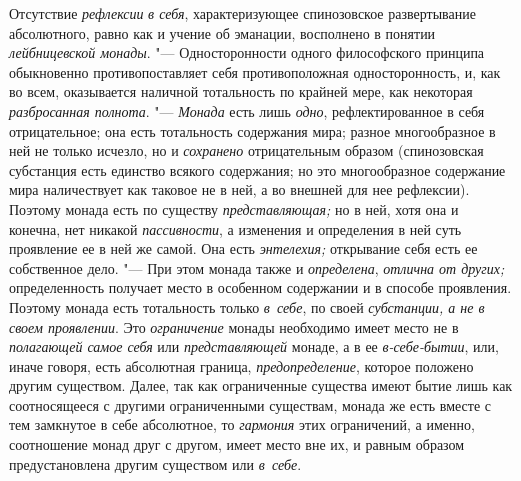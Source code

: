 Отсутствие {\em рефлексии} {\em в
себя}, характеризующее спинозовское развертывание абсолютного, равно как и
учение об эманации, восполнено в понятии
{\em лейбницевской монады}. "--- Односторонности одного
философского принципа обыкновенно противопоставляет себя противоположная
односторонность, и, как во всем, оказывается наличной тотальность по
крайней мере, как некоторая {\em разбросанная
полнота}. "--- {\em Монада} есть лишь
{\em одно}, рефлектированное в себя отрицательное; она
есть тотальность содержания мира; разное многообразное в ней не только
исчезло, но и {\em сохранено} отрицательным образом
(спинозовская субстанция есть единство всякого содержания; но это
многообразное содержание мира наличествует как таковое не в ней, а во
внешней для нее рефлексии). Поэтому монада есть по существу
{\em представляющая;} но в ней, хотя она и конечна, нет
никакой {\em пассивности}, а изменения и определения в
ней суть проявление ее в ней же самой. Она есть
{\em энтелехия;} открывание себя есть ее собственное
дело. "--- При этом монада также и {\em определена},
{\em отлична от других;} определенность получает место
в особенном содержании и в способе проявления. Поэтому монада есть
тотальность только {\em в~себе}, по своей
{\em субстанции, а не в своем проявлении}. Это
{\em ограничение} монады необходимо имеет место не в
{\em полагающей самое себя} или
{\em представляющей} монаде, а в ее
{\em в-себе-бытии}, или, иначе говоря, есть абсолютная
граница, {\em предопределение}, которое положено
другим существом. Далее, так как ограниченные существа имеют бытие лишь как
соотносящееся с другими ограниченными существам, монада же есть вместе с
тем замкнутое в себе абсолютное, то {\em гармония} этих
ограничений, а именно, соотношение монад друг с другом, имеет место вне их,
и равным образом предустановлена другим существом или
{\em в~себе}.

